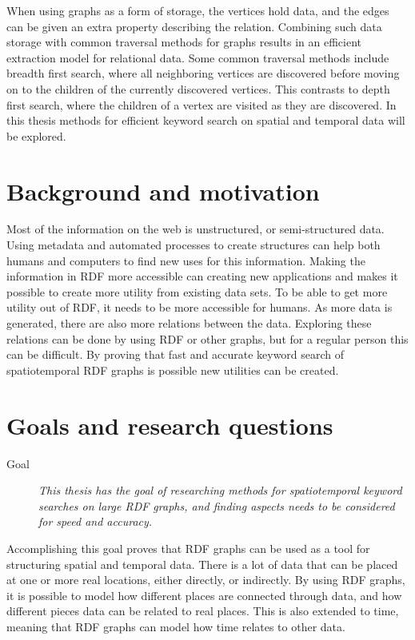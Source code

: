 When using graphs as a form of storage, the vertices hold data, and the edges can be given an extra property describing the relation. Combining such data storage with common traversal methods for graphs results in an efficient extraction model for relational data. Some common traversal methods include breadth first search, where all neighboring vertices are discovered before moving on to the children of the currently discovered vertices. This contrasts to depth first search, where the children of a vertex are visited as they are discovered. In this thesis methods for efficient keyword search on spatial and temporal data will be explored.

\section{Background and motivation}
\label{sec:BackgroundAndMotivation}
Most of the information on the web is unstructured, or semi-structured data. Using metadata and automated processes to create structures can help both humans and computers to find new uses for this information. Making the information in RDF more accessible can creating new applications and makes it possible to create more utility from existing data sets. To be able to get more utility out of RDF, it needs to be more accessible for humans. As more data is generated, there are also more relations between the data. Exploring these relations can be done by using RDF or other graphs, but for a regular person this can be difficult. By proving that fast and accurate keyword search of spatiotemporal RDF graphs is possible new utilities can be created.

\section{Goals and research questions}
\label{sec:Goals and Research Questions}
\begin{description}
    \item[Goal] {\em This thesis has the goal of researching methods for spatiotemporal keyword searches on large RDF graphs, and finding aspects needs to be considered for speed and accuracy.}
\end{description}
Accomplishing this goal proves that RDF graphs can be used as a tool for structuring spatial and temporal data. There is a lot of data that can be placed at one or more real locations, either directly, or indirectly. By using RDF graphs, it is possible to model how different places are connected through data, and how different pieces data can be related to real places. This is also extended to time, meaning that RDF graphs can model how time relates to other data.

